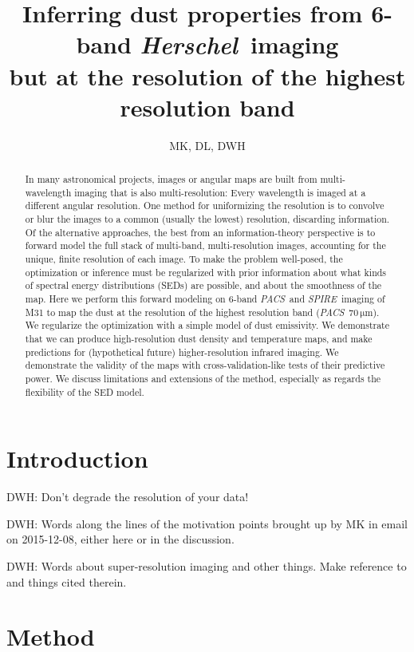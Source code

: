 \documentclass[12pt, preprint]{aastex}
\newcommand{\project}[1]{\textsl{#1}}
\newcommand{\Herschel}{\project{Herschel}}
\newcommand{\acronym}[1]{{\small{#1}}}
\newcommand{\PACS}{\project{\acronym{PACS}}}
\newcommand{\SPIRE}{\project{\acronym{SPIRE}}}
\newcommand{\unit}[1]{{\mathrm{#1}}}
\newcommand{\mum}{\unit{\mu m}}
\begin{document}
\title{Inferring dust properties from 6-band \Herschel\ imaging \\ 
       but at the resolution of the highest resolution band}
\author{MK, DL, DWH}

\begin{abstract}
In many astronomical projects, images or angular maps are built from
multi-wavelength imaging that is also multi-resolution:
Every wavelength is imaged at a different angular resolution.
One method for uniformizing the resolution is to convolve or blur the
images to a common (usually the lowest) resolution, discarding
information.
Of the alternative approaches, the best from an information-theory
perspective is to forward model the full stack of multi-band,
multi-resolution images, accounting for the unique, finite resolution
of each image.
To make the problem well-posed, the optimization or inference must be
regularized with prior information about what kinds of spectral energy
distributions (\acronym{SED}s) are possible, and about the smoothness of the map.
Here we perform this forward modeling on 6-band \PACS\ and
\SPIRE\ imaging of M31 to map the dust at the resolution of the
highest resolution band (\PACS~$70\,\mum$).
We regularize the optimization with a simple model of dust emissivity.
We demonstrate that we can produce high-resolution dust density and
temperature maps, and make predictions for (hypothetical future)
higher-resolution infrared imaging.
We demonstrate the validity of the maps with cross-validation-like
tests of their predictive power.
We discuss limitations and extensions of the method, especially as
regards the flexibility of the \acronym{SED} model.
\end{abstract}

\section{Introduction}

DWH: Don't degrade the resolution of your data!

DWH: Words along the lines of the motivation points brought up by MK
in email on 2015-12-08, either here or in the discussion.

DWH: Words about super-resolution imaging and other things.  Make
reference to \citet{orieux} and things cited therein.

\section{Method}
\end{document}
